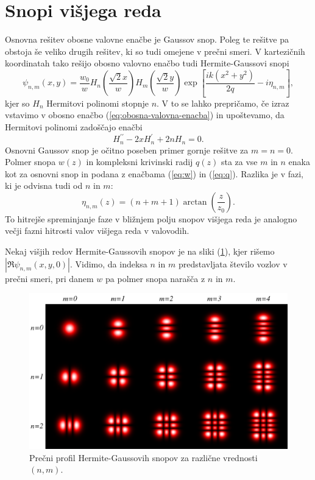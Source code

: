\section{Snopi višjega reda}

Osnovna rešitev obosne valovne enačbe je Gaussov snop. Poleg te rešitve pa obstoja še veliko 
drugih rešitev, ki so tudi omejene v prečni smeri. V kartezičnih koordinatah tako rešijo obosno valovno enačbo
tudi Hermite-Gaussovi snopi
\begin{equation}
\psi_{n,m}(x,y)=\frac{w_{0}}{w}H_{n}\left(\frac{\sqrt{2}x}{w}\right)H_{m}\left(\frac{\sqrt{2}y}{w}\right)
\exp\left[\frac{ik(x^{2}+y^{2})}{2q}-i\eta_{n,m}\right],
\label{eq:Gauss-Hermitevi}
\end{equation}
kjer so $H_{n}$ Hermitovi polinomi stopnje $n$. V to se lahko
prepričamo, če izraz vstavimo v obosno enačbo (\ref{eq:obosna-valovna-enacba}) in upoštevamo, 
da Hermitovi polinomi zadoščajo enačbi 
\begin{equation}
H_{n}^{\prime\prime}-2xH_{n}^{\prime}+2nH_{n}=0.
\end{equation}
Osnovni Gaussov snop je očitno poseben primer gornje rešitve za $m=n=0$.
Polmer snopa $w(z)$ in kompleksni krivinski radij $q(z)$ sta za
vse $m$ in $n$ enaka kot za osnovni snop in podana z enačbama (\ref{eq:w})
in (\ref{eq:q}). Razlika je v fazi, ki je odvisna tudi od $n$ in $m$: 
\begin{equation}
\eta_{n,m}\left(z\right)=(n+m+1)\arctan\left(\frac{z}{z_{0}}\right).
\end{equation}
To hitrejše spreminjanje faze v bližnjem polju snopov višjega reda
je analogno večji fazni hitrosti valov višjega reda v valovodih.


Nekaj višjih redov Hermite-Gaussovih snopov je na sliki (\ref{fig:Gauss-Hermitevi-snopi}),
kjer rišemo $|\Re\psi_{n,m}(x, y, 0)|$.
Vidimo, da indeksa $n$ in $m$ predstavljata število vozlov v prečni smeri,
pri danem $w$ pa polmer snopa narašča z $n$ in $m$. 

\begin{figure}[h]
\centering
\includegraphics[width=12truecm]{slike/03_Hermite_Gauss.png}
\caption{Prečni profil Hermite-Gaussovih snopov za različne vrednosti $(n,m)$.}
\label{fig:Gauss-Hermitevi-snopi}
\end{figure}

